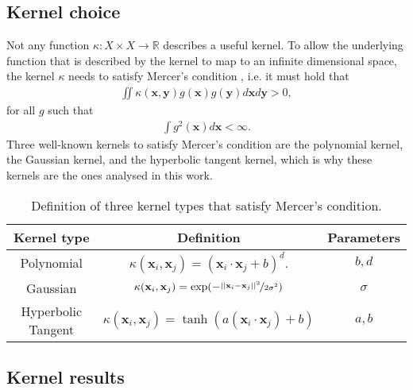\subsection{Kernel choice}

Not any function $\kappa: X \times X \to \mathbb{R}$ describes a useful kernel. To allow the underlying function that is described by the kernel to map to an infinite dimensional space, the kernel $\kappa$ needs to satisfy Mercer's condition \cite{cortes1995support}, i.e. it must hold that 
\begin{align*}
	\iint \kappa(\textbf{x}, \textbf{y}) g(\textbf{x}) g(\textbf{y}) d \textbf{x} d\textbf{y} > 0,
\end{align*}
for all $g$ such that
\begin{align*}
	\int g^2(\textbf{x})d\textbf{x} < \infty.
\end{align*}
Three well-known kernels to satisfy Mercer's condition are the polynomial kernel, the Gaussian kernel, and the hyperbolic tangent kernel, which is why these kernels are the ones analysed in this work. 

\begin{table}[h]
	\centering
	\begin{tabular}{|c|c|c|}
		\hline
		Kernel type & Definition & Parameters \\
		\hline
		Polynomial & $\kappa(\textbf{x}_i, \textbf{x}_j) = (\textbf{x}_i \cdot \textbf{x}_j + b)^d.$ & $b, d$ \\
		Gaussian & $\kappa(\textbf{x}_i, \textbf{x}_j) =\exp (-\nicefrac{||\textbf{x}_i - \textbf{x}_j||^2}{2\sigma^2})$ & $\sigma$ \\
		Hyperbolic Tangent & $\kappa(\textbf{x}_i, \textbf{x}_j) = \tanh (a(\textbf{x}_i \cdot \textbf{x}_j) + b)$ & $a, b$ \\
		\hline
	\end{tabular}
	\caption{Definition of three kernel types that satisfy Mercer's condition.}
	\label{tab:kernels}
\end{table}

\subsection{Kernel results}


